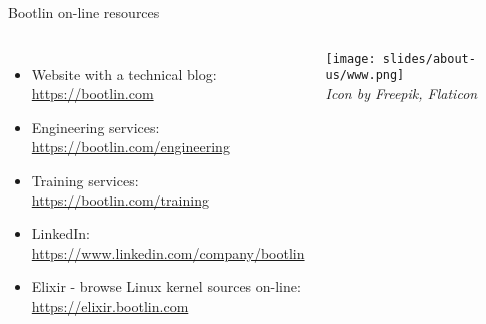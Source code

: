 \begin{frame}{Bootlin on-line resources}
  \begin{columns}
    \begin{itemize}
    \item Website with a technical blog:\\
      \url{https://bootlin.com}
    \item Engineering services:\\
      \url{https://bootlin.com/engineering}
    \item Training services:\\
      \url{https://bootlin.com/training}
    \item LinkedIn:\\
      \url{https://www.linkedin.com/company/bootlin}
    \item Elixir - browse Linux kernel sources on-line:\\
      \url{https://elixir.bootlin.com}
    \end{itemize}
    \begin{center}
      \texttt{[image: slides/about-us/www.png]}\\
      {\tiny {\em Icon by Freepik, Flaticon}}
    \end{center}
  \end{columns}
\end{frame}
